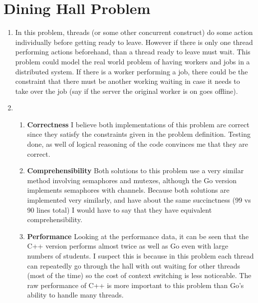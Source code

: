 \documentclass[11pt]{article}
\begin{document}
\section{Dining Hall Problem}
\begin{enumerate}
	\item In this problem, threads (or some other concurrent construct) do some action individually before getting ready to leave. However if there is only one thread performing actions beforehand, than a thread ready to leave must wait. This problem could model the real world problem of having workers and jobs in a distributed system. If there is a worker performing a job, there could be the constraint that there must be another working waiting in case it needs to take over the job (say if the server the original worker is on goes offline).
	\item
	\begin{enumerate}
	\item \textbf{Correctness}\linebreak
	I believe both implementations of this problem are correct since they satisfy the constraints given in the problem definition. Testing done, as well of logical reasoning of the code convinces me that they are correct.
	\item \textbf{Comprehensibility}\linebreak
	Both solutions to this problem use a very similar method involving semaphores and mutexes, although the Go version implements semaphores with channels. Because both solutions are implemented very similarly, and have about the same succinctness (99 vs 90 lines total) I would have to say that they have equivalent comprehensibility.
	\item \textbf{Performance}\linebreak
	Looking at the performance data, it can be seen that the C++ version performs almost twice as well as Go even with large numbers of students. I suspect this is because in this problem each thread can repeatedly go through the hall with out waiting for other threads (most of the time) so the cost of context switching is less noticeable. The raw performance of C++ is more important to this problem than Go's ability to handle many threads.
	\end{enumerate}
	
\end{enumerate}
\end{document}
